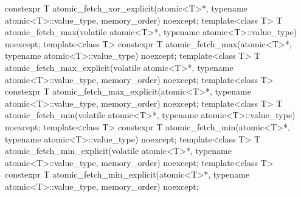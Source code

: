 \begin{codeblock}
{    constexpr T atomic_fetch_xor_explicit(atomic<T>*, typename atomic<T>::value_type,
                                          memory_order) noexcept;
  template<class T>
    T atomic_fetch_max(volatile atomic<T>*, typename atomic<T>::value_type) noexcept;
  template<class T>
    constexpr T atomic_fetch_max(atomic<T>*, typename atomic<T>::value_type) noexcept;
  template<class T>
    T atomic_fetch_max_explicit(volatile atomic<T>*, typename atomic<T>::value_type,
                                memory_order) noexcept;
  template<class T>
    constexpr T atomic_fetch_max_explicit(atomic<T>*, typename atomic<T>::value_type,
                                          memory_order) noexcept;
  template<class T>
    T atomic_fetch_min(volatile atomic<T>*, typename atomic<T>::value_type) noexcept;
  template<class T>
    constexpr T atomic_fetch_min(atomic<T>*, typename atomic<T>::value_type) noexcept;
  template<class T>
    T atomic_fetch_min_explicit(volatile atomic<T>*, typename atomic<T>::value_type,
                                memory_order) noexcept;
  template<class T>
    constexpr T atomic_fetch_min_explicit(atomic<T>*, typename atomic<T>::value_type,
                                          memory_order) noexcept;

}
\end{codeblock}
